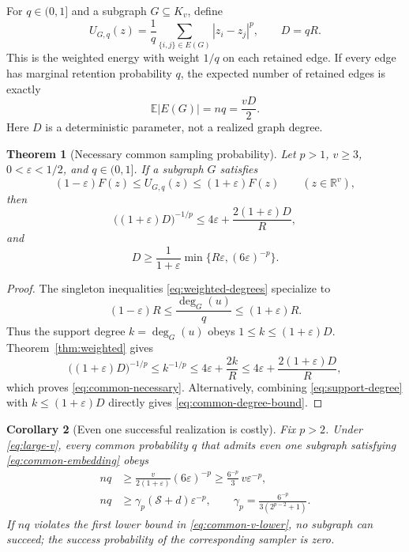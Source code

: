 \documentclass[11pt]{article}
\theoremstyle{spaced}
\newtheorem{theorem}{Theorem}[section]
\newtheorem{corollary}[theorem]{Corollary}
\numberwithin{equation}{section}
\newcommand{\E}{\mathbb{E}}
\newcommand{\R}{\mathbb{R}}
\newcommand{\Sp}{\mathcal{S}}
\begin{document}
For $q\in(0,1]$ and a subgraph $G\subseteq K_v$, define
\[
 U_{G,q}(z)=\frac1q\sum_{\{i,j\}\in E(G)}|z_i-z_j|^p,
 \qquad D=qR.
\]
This is the weighted energy with weight $1/q$ on each retained edge.
If every edge has marginal retention probability $q$, the expected
number of retained edges is exactly
\begin{equation}\label{eq:expected-size}
 \E|E(G)|=nq=\frac{vD}{2}.
\end{equation}
Here $D$ is a deterministic parameter, not a realized graph degree.

\begin{theorem}[Necessary common sampling probability]\label{thm:common}
Let $p>1$, $v\ge3$, $0<\varepsilon<1/2$, and $q\in(0,1]$.
If a subgraph $G$ satisfies
\begin{equation}\label{eq:common-embedding}
 (1-\varepsilon)F(z)\le U_{G,q}(z)\le(1+\varepsilon)F(z)
 \qquad(z\in\R^v),
\end{equation}
then
\begin{equation}\label{eq:common-necessary}
 \bigl((1+\varepsilon)D\bigr)^{-1/p}
 \le4\varepsilon+\frac{2(1+\varepsilon)D}{R},
\end{equation}
and
\begin{equation}\label{eq:common-degree-bound}
 D\ge\frac1{1+\varepsilon}
       \min\{R\varepsilon,(6\varepsilon)^{-p}\}.
\end{equation}
\end{theorem}

\begin{proof}
The singleton inequalities \eqref{eq:weighted-degrees} specialize to
\begin{equation}\label{eq:unweighted-degrees}
 (1-\varepsilon)R\le\frac{\deg_G(u)}q
 \le(1+\varepsilon)R.
\end{equation}
Thus the support degree $k=\deg_G(u)$ obeys
$1\le k\le(1+\varepsilon)D$. Theorem~\ref{thm:weighted} gives
\[
 \bigl((1+\varepsilon)D\bigr)^{-1/p}
 \le k^{-1/p}
 \le4\varepsilon+\frac{2k}{R}
 \le4\varepsilon+\frac{2(1+\varepsilon)D}{R},
\]
which proves \eqref{eq:common-necessary}. Alternatively, combining
\eqref{eq:support-degree} with $k\le(1+\varepsilon)D$ directly gives
\eqref{eq:common-degree-bound}.
\end{proof}

\begin{corollary}[Even one successful realization is costly]
\label{cor:common-accuracy}
Fix $p>2$. Under \eqref{eq:large-v}, every common probability $q$ that
admits even one subgraph satisfying \eqref{eq:common-embedding} obeys
\begin{align}
 nq
 &\ge\frac{v}{2(1+\varepsilon)}(6\varepsilon)^{-p}
 \ge\frac{6^{-p}}3\,v\varepsilon^{-p},
 \label{eq:common-v-lower}\\
 nq
 &\ge\gamma_p(\Sp+d)\varepsilon^{-p},
 \qquad
 \gamma_p=\frac{6^{-p}}{3(2^{p-2}+1)}.
 \label{eq:common-sensitivity-lower}
\end{align}
If $nq$ violates the first lower bound in
\eqref{eq:common-v-lower}, no subgraph can succeed; the success
probability of the corresponding sampler is zero.
\end{corollary}
\end{document}
